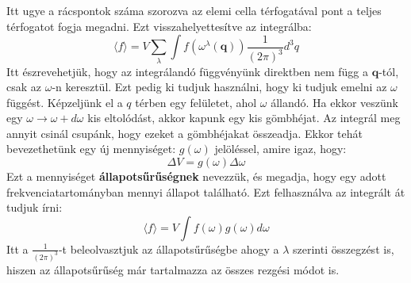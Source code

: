 \documentclass[../main.tex]{subfiles}
\begin{document}
Itt ugye a rácspontok száma szorozva az elemi cella térfogatával pont a teljes térfogatot fogja megadni. Ezt visszahelyettesítve az integrálba:
\begin{equation}
    \langle f \rangle = V \sum_{\lambda} \int f(\omega^\lambda(\mathbf{q})) \frac{1}{(2 \pi)^3} d^3 q
\end{equation}
Itt észrevehetjük, hogy az integrálandó függvényünk direktben nem függ a $\mathbf{q}$-tól, csak az $\omega$-n keresztül. Ezt pedig ki tudjuk használni, hogy ki tudjuk emelni az $\omega$ függést.
Képzeljünk el a $q$ térben egy felületet, ahol $\omega$ állandó. Ha ekkor veszünk egy $\omega \to \omega + d\omega$ kis eltolódást, akkor kapunk egy kis gömbhéjat. Az integrál meg annyit csinál csupánk, hogy ezeket a gömbhéjakat összeadja.
Ekkor tehát bevezethetünk egy új mennyiséget: $g(\omega)$ jelöléssel, amire igaz, hogy:
\begin{equation}
    \Delta V = g(\omega) \Delta \omega
\end{equation}
Ezt a mennyiséget \textbf{állapotsűrűségnek} nevezzük, és megadja, hogy egy adott frekvenciatartományban mennyi állapot található. Ezt felhasználva az integrált át tudjuk írni:
\begin{equation}
    \langle f \rangle = V \int f(\omega) g(\omega) d\omega
\end{equation}
Itt a $\frac{1}{(2 \pi)^3}$-t beleolvasztjuk az állapotsűrűségbe ahogy a $\lambda$ szerinti összegzést is, hiszen az állapotsűrűség már tartalmazza az összes rezgési módot is.
\end{document}
